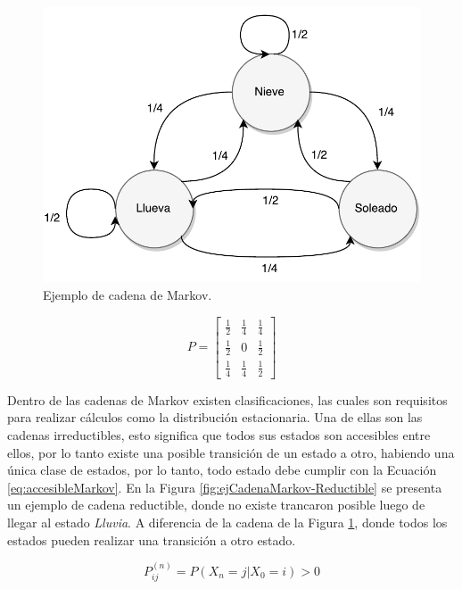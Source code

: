 \begin{figure}[ht!]
	\centering
	\includegraphics[scale=0.5]{images/EjCadenaMarkov.pdf}
	\caption{Ejemplo de cadena de Markov.}
	\label{fig:ejCadenaMarkov}
\end{figure}

\begin{equation} \label{eq:ejCadenaMarkov}
	P =
	\begin{bmatrix}
		\frac{1}{2} & \frac{1}{4} & \frac{1}{4} \\
		\frac{1}{2} & 0 & \frac{1}{2} \\
		\frac{1}{4} & \frac{1}{4} & \frac{1}{2}
	\end{bmatrix}	
\end{equation}

\normalsize{Dentro de las cadenas de Markov existen clasificaciones, las cuales son requisitos para realizar c\'alculos como la distribuci\'on estacionaria. Una de ellas son las cadenas irreductibles, esto significa que todos sus estados son accesibles entre ellos, por lo tanto existe una posible transici\'on de un estado a otro, habiendo una \'unica clase de estados, por lo tanto, todo estado debe cumplir con la Ecuaci\'on} \ref{eq:accesibleMarkov}. \normalsize{En la Figura} \ref{fig:ejCadenaMarkov-Reductible} \normalsize{se presenta un ejemplo de cadena reductible, donde no existe trancaron posible luego de llegar al estado \textit{Lluvia}. A diferencia de la cadena de la Figura} \ref{fig:ejCadenaMarkov}, \normalsize{donde todos los estados pueden realizar una transici\'on a otro estado.}

\begin{equation} \label{eq:accesibleMarkov}
	P_{ij}^{(n)} = P(X_n = j | X_0 = i) > 0
\end{equation}

